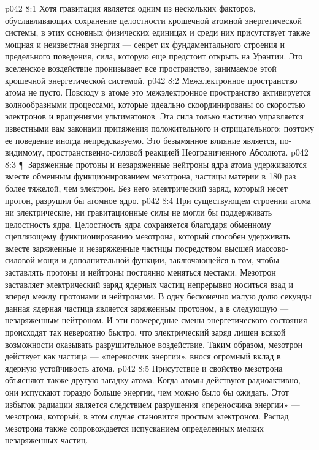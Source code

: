 \vs p042 8:1 Хотя гравитация является одним из нескольких факторов, обуславливающих сохранение целостности крошечной атомной энергетической системы, в этих основных физических единицах и среди них присутствует также мощная и неизвестная энергия --- секрет их фундаментального строения и предельного поведения, сила, которую еще предстоит открыть на Урантии. Это вселенское воздействие пронизывает все пространство, занимаемое этой крошечной энергетической системой.
\vs p042 8:2 Межэлектронное пространство атома не пусто. Повсюду в атоме это межэлектронное пространство активируется волнообразными процессами, которые идеально скоординированы со скоростью электронов и вращениями ультиматонов. Эта сила только частично управляется известными вам законами притяжения положительного и отрицательного; поэтому ее поведение иногда непредсказуемо. Это безымянное влияние является, по\hyp{}видимому, пространственно\hyp{}силовой реакцией Неограниченного Абсолюта.
\vs p042 8:3 \P\ Заряженные протоны и незаряженные нейтроны ядра атома удерживаются вместе обменным функционированием мезотрона, частицы материи в 180 раз более тяжелой, чем электрон. Без него электрический заряд, который несет протон, разрушил бы атомное ядро.
\vs p042 8:4 При существующем строении атома ни электрические, ни гравитационные силы не могли бы поддерживать целостность ядра. Целостность ядра сохраняется благодаря обменному сцепляющему функционированию мезотрона, который способен удерживать вместе заряженные и незаряженные частицы посредством высшей массово\hyp{}силовой мощи и дополнительной функции, заключающейся в том, чтобы заставлять протоны и нейтроны постоянно меняться местами. Мезотрон заставляет электрический заряд ядерных частиц непрерывно носиться взад и вперед между протонами и нейтронами. В одну бесконечно малую долю секунды данная ядерная частица является заряженным протоном, а в следующую --- незаряженным нейтроном. И эти поочередные смены энергетического состояния происходят так невероятно быстро, что электрический заряд лишен всякой возможности оказывать разрушительное воздействие. Таким образом, мезотрон действует как частица --- «переносчик энергии», внося огромный вклад в ядерную устойчивость атома.
\vs p042 8:5 Присутствие и свойство мезотрона объясняют также другую загадку атома. Когда атомы действуют радиоактивно, они испускают гораздо больше энергии, чем можно было бы ожидать. Этот избыток радиации является следствием разрушения «переносчика энергии» --- мезотрона, который, в этом случае становится простым электроном. Распад мезотрона также сопровождается испусканием определенных мелких незаряженных частиц.
